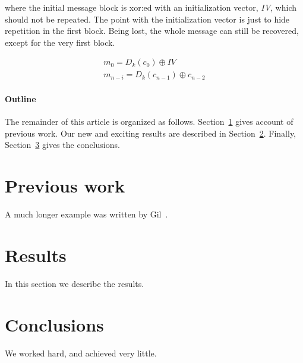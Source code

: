 \documentclass[12pt]{article}
\begin{document}
where the initial message block is xor:ed with an initialization vector, \emph{IV}, which should not be repeated. The point with the initialization vector is just to hide repetition in the first block. Being lost, the whole message can still be recovered, except for the very first block.

\begin{equation}
\begin{split}
m_0 = D_k(c_0) \oplus IV \\
m_{n-i} = D_k(c_{n-1}) \oplus c_{n-2}
\end{split}
\end{equation}


 
\paragraph{Outline}
The remainder of this article is organized as follows.
Section~\ref{previous work} gives account of previous work.
Our new and exciting results are described in Section~\ref{results}.
Finally, Section~\ref{conclusions} gives the conclusions.

\section{Previous work}\label{previous work}
A much longer \LaTeXe{} example was written by Gil~\cite{Gil:02}.

\section{Results}\label{results}
In this section we describe the results.



\section{Conclusions}\label{conclusions}
We worked hard, and achieved very little.




\printindex
\end{document}
